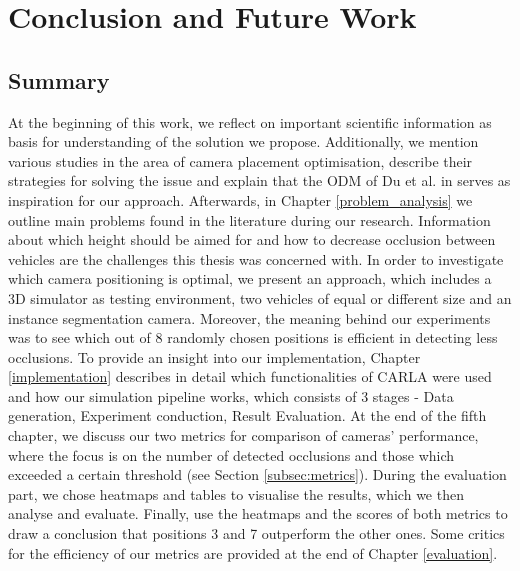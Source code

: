 \chapter{Conclusion and Future Work}
\label{conclusion}
\section{Summary}
At the beginning of this work, we reflect on important scientific information as basis for understanding of the solution we propose. Additionally, we mention various studies in the area of camera placement optimisation, describe their strategies for solving the issue and explain that the ODM of Du et al. in \cite{occlusion_degree_model} serves as inspiration for our approach. Afterwards, in Chapter \ref{problem_analysis} we outline main problems found in the literature during our research. Information about which height should be aimed for and how to decrease occlusion between vehicles are the challenges this thesis was concerned with. In order to investigate which camera positioning is optimal, we present an approach, which includes a 3D simulator as testing environment, two vehicles of equal or different size and an instance segmentation camera. Moreover, the meaning behind our experiments was to see which out of 8 randomly chosen positions is efficient in detecting less occlusions. To provide an insight into our implementation, Chapter \ref{implementation} describes in detail which functionalities of CARLA were used and how our simulation pipeline works, which consists of 3 stages - Data generation, Experiment conduction, Result Evaluation. At the end of the fifth chapter, we discuss our two metrics for comparison of cameras' performance, where the focus is on the number of detected occlusions and those which exceeded a certain threshold (see Section \ref{subsec:metrics}). During the evaluation part, we chose heatmaps and tables to visualise the results, which we then analyse and evaluate. Finally, use the heatmaps and the scores of both metrics to draw a conclusion that positions 3 and 7 outperform the other ones. Some critics for the efficiency of our metrics are provided at the end of Chapter \ref{evaluation}. 


